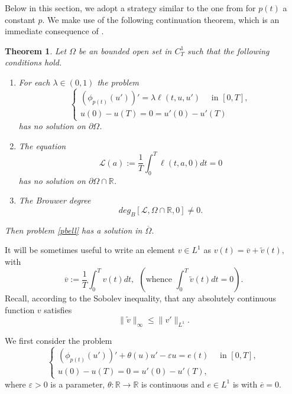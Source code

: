 \documentclass[11pt]{amsart}
\newtheorem{theorem}{Theorem}[section]
\numberwithin{equation}{section} \textwidth=15.5cm
\begin{document}
Below in this section, we adopt a strategy similar to the one from \cite[Section 6]{[Maw01]} for $p(t)$ a constant $p$. We make use of the following continuation theorem, which is an immediate consequence of \cite[Theorem 4.1]{[HMMT]}.
\begin{theorem}\label{thHMMT}
Let $\Omega$ be an bounded open set in $C_T^1$ such that the following conditions hold.
\begin{enumerate}
  \item[$(H_1)$] For each $\lambda\in(0,1)$ the problem
  \begin{equation}\label{pblambda}
	\left \{
            \begin{array}{ll}
		      (\phi_{p(t)}(u'))'=\lambda\ell(t,u,u')\quad \mbox{ in }[0,T],\\
		      u(0)-u(T)=0=u'(0)-u'(T)
			\end{array}
  \right.
\end{equation}
has no solution on $\partial\Omega$.
  \item[$(H_2)$] The equation
  $$\mathcal{L}(a):=\frac{1}{T}\int_0^T\ell(t,a,0)dt=0$$
  has no solution on $\partial\Omega\cap\mathbb{R}$.
  \item[$(H_3)$] The Brouwer degree
  $$deg_B[\mathcal{L},\Omega\cap\mathbb{R},0]\neq0.$$
\end{enumerate}
Then problem \eqref{pbell} has a solution in $\overline{\Omega}$.
\end{theorem}
\medskip

It will be sometimes useful to write an element $v\in L^1$  as $v(t)=\overline{v}+\tilde{v}(t),$  with
$$\overline{v}:=\frac{1}{T}\int_0^T v(t)dt,\ \  \left ( \mbox{whence } \int_0^T\tilde{v}(t)dt=0 \right ).$$
Recall, according to the Sobolev inequality, that any absolutely continuous function $v$ satisfies
\begin{equation}\label{sobolev}
    \|\tilde{v}\|_\infty\leq\|v'\|_{L^1}.
\end{equation}
\smallskip

We first consider the problem
\begin{equation}\label{pbepsilon}
	\left \{
            \begin{array}{ll}
		      (\phi_{p(t)}(u'))'+\theta(u)u'-\varepsilon u=e(t)\quad \mbox{ in }[0,T],\\
		      u(0)-u(T)=0=u'(0)-u'(T),
			\end{array}
\right.
\end{equation}
where $\varepsilon>0$ is a parameter, $\theta:\mathbb{R}\to\mathbb{R}$ is continuous and $e\in L^1$ is with $\overline{e}=0.$
\end{document}
